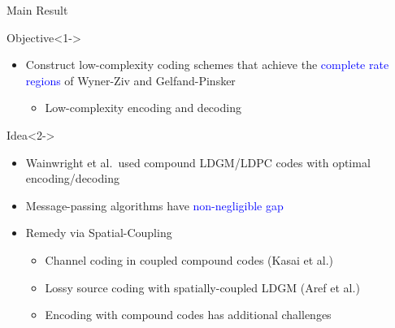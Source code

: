 \documentclass[10pt,presentation]{beamer}
\begin{document}
\begin{frame}{Main Result}
  \begin{block}{Objective}<1->
    \begin{itemize}
    \item Construct \alert{low-complexity} coding schemes that achieve the \textcolor{blue}{complete rate regions} of Wyner-Ziv and Gelfand-Pinsker \vspace{0.1cm}
      \begin{itemize}
      \item Low-complexity encoding and decoding
      \end{itemize}
    \end{itemize}
  \end{block}
  \vspace{0.1cm}
  \begin{block}{Idea}<2->
    \begin{itemize}
    \item Wainwright et al.~used compound LDGM/LDPC codes with \alert{optimal encoding/decoding}\vspace{0.1cm}
    \item Message-passing algorithms have \textcolor{blue}{non-negligible gap}\vspace{0.1cm}
    \item<3-> Remedy via \alert{Spatial-Coupling}
      \begin{itemize}
      \item Channel coding in coupled compound codes (Kasai et al.)
      \item Lossy source coding with spatially-coupled LDGM (Aref et al.)
      \item Encoding with \alert{compound codes has additional challenges}
      \end{itemize}
    \end{itemize}
  \end{block}
\end{frame}
\end{document}

